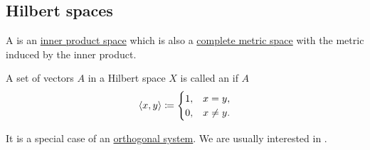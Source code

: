 \subsection{Hilbert spaces}\label{subsec:hilbert_spaces}

\begin{definition}\label{def:hilbert_space}
  A  is an \hyperref[def:inner_product_space]{inner product space} which is also a \hyperref[def:complete_metric_space]{complete metric space} with the metric induced by the inner product.
\end{definition}

\begin{definition}\label{def:orthonormal_system}
  A set of vectors \( A \) in a Hilbert space \( X \) is called an  if \( A \)
  \begin{equation*}
    \left\langle x, y \right\rangle \coloneqq \begin{cases}
      1, & x = y,    \\
      0, & x \neq y.
    \end{cases}
  \end{equation*}

  It is a special case of an \hyperref[def:orthogonality]{orthogonal system}. We are usually interested in .
\end{definition}
